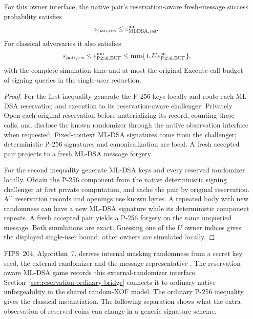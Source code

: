 \begin{proposition}
\label{prop:reservation-signature-components}
For this owner interface, the native pair's reservation-aware fresh-message
success probability satisfies
\[
 \varepsilon_{\rm pair,res}
 \le\varepsilon_{\rm MLDSA,res}^{\rm mu}.
\]
For classical adversaries it also satisfies
\[
 \varepsilon_{\rm pair,res}
 \le\varepsilon_{\rm P256,EUF}^{\rm mu}
 \le\min\{1,U\varepsilon_{\rm P256,EUF}^{\rm su}\},
\]
with the complete simulation time and at most the original Execute-call
budget of signing queries in the single-user reduction.
\end{proposition}
\begin{proof}
For the first inequality generate the P-256 keys locally and route each
ML-DSA reservation and execution to its reservation-aware challenger.
Privately Open each original reservation before materializing its record,
counting these calls, and disclose the known randomizer through the
native observation interface when requested. Fixed-context ML-DSA
signatures come from the challenger; deterministic P-256 signatures and
canonicalization are local. A fresh accepted pair projects to a fresh
ML-DSA message forgery.

For the second inequality generate ML-DSA keys and every reserved
randomizer locally. Obtain the P-256 component from the native
deterministic signing challenger at first private computation, and cache
the pair by original reservation. All reservation records and openings
use known bytes. A repeated body with new randomness can have a new
ML-DSA signature while its deterministic component repeats. A fresh
accepted pair yields a P-256 forgery on the same unqueried message.
Both simulations are exact. Guessing one of the $U$ owner indices gives
the displayed single-user bound; other owners are simulated locally.
\end{proof}

FIPS~204, Algorithm~7, derives internal masking randomness from a secret
key seed, the external randomizer and the message representative
\cite{fips204}. The reservation-aware ML-DSA game records this
external-randomizer interface. Section~\ref{sec:reservation-ordinary-bridge}
connects it to ordinary native unforgeability in the shared random-XOF
model. The ordinary P-256 inequality gives the classical instantiation.
The following separation shows what the extra observation of reserved
coins can change in a generic signature scheme.

